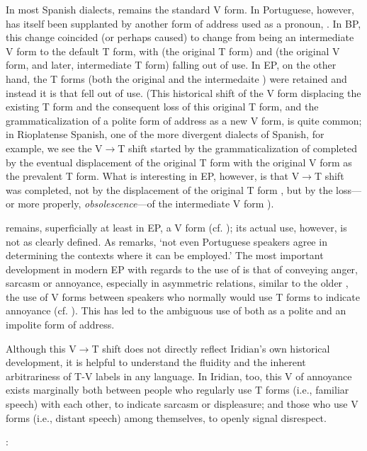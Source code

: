{{				In most Spanish dialects,  remains
				the standard V form. In Portuguese, however,
				 has itself been supplanted by another form of
				address used as a pronoun, . In BP,
				this change coincided (or perhaps caused)  to change
				from being an intermediate V form to the default T form, with
				 (the original T form) and  (the
				original V form, and later, intermediate T form) falling out of
				use. In EP, on the other hand, the T forms
				(both the original  and the intermedaite
				) were retained and instead it is 
				that fell out of use. (This historical shift of the V form
				displacing the existing T form and the consequent loss of this
				original T form, and the grammaticalization of a polite form of
				address as a new V form, is quite common; in Rioplatense
				Spanish, one of the more divergent dialects of
				Spanish, for example, we see the V$\rightarrow$T
				shift started by the grammaticalization of 
				completed by the eventual displacement of the original T form
				 with the original V form  as the
				prevalent T form. What is interesting in EP, however, is that
				V$\rightarrow$T shift was completed, not by the displacement of
				the original T form , but by the loss---or more
				properly, \emph{obsolescence}---of the intermediate V form
				).

				 remains, superficially at least in
				EP, a V form (cf. \cite[85]{ganhoport}); its
				actual use, however, is not as clearly defined. As
				\textcite{laraport} remarks, `not even Portuguese speakers agree
				in determining the contexts where it can be employed.' The most
				important development in modern EP with
				regards to the use of  is that of conveying
				anger, sarcasm or annoyance, especially in asymmetric relations,
				similar to the older , the use of V forms between
				speakers who normally would use T forms to indicate annoyance
				(cf. \cite{hummelport}). This has led to the ambiguous use of
				 both as a polite and an impolite form of
				address.

				Although this V$\rightarrow$T shift does not directly reflect
			Iridian's own historical development, it is helpful to understand
			the fluidity and the inherent arbitrariness of T-V labels in any
			language. In Iridian, too, this V of annoyance exists marginally
			both between people who regularly use T forms (i.e., familiar
			speech) with each other, to indicate sarcasm or displeasure; and
			those who use V forms (i.e., distant speech) among themselves, to
			openly signal disrespect. }:\\
				 }
